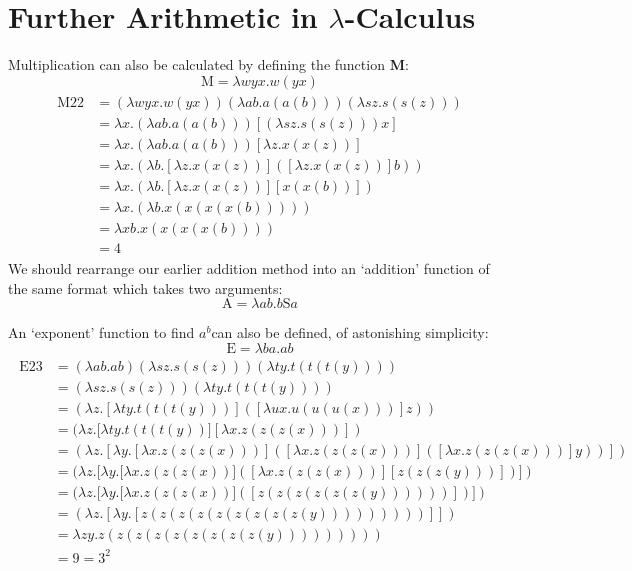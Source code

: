 \documentclass[Master.tex]{subfiles}
\begin{document}
\appendix
\appendixpage
\section{Further Arithmetic in $\lambda$-Calculus}
Multiplication can also be calculated by defining the function \textbf{M}:
\cite{rojas2015lambdatutorial}
\begin{equation*}
\bm{\mathrm{M}} = \lambda wyx.w(yx)
\end{equation*}  
\begin{gather*}
\begin{aligned}
\bm{\mathrm{M22}} &= (\lambda wyx.w(yx))(\lambda ab.a(a(b)))(\lambda sz.s(s(z)))\\
&= \lambda x.(\lambda ab.a(a(b)))[(\lambda sz.s(s(z)))x]\\
&= \lambda x.(\lambda ab.a(a(b)))[\lambda z.x(x(z))]\\
&= \lambda x.(\lambda b.[\lambda z.x(x(z))]([\lambda z.x(x(z))]b))\\
&= \lambda x.(\lambda b.[\lambda z.x(x(z))][x(x(b))])\\
&= \lambda x.(\lambda b.x(x(x(x(b)))))\\
&= \lambda xb.x(x(x(x(b))))\\
&= \bm{\mathrm{4}}
\end{aligned}
\end{gather*}
We should rearrange our earlier addition method into an `addition' function of the same format which takes two arguments:
\begin{equation*}
\bm{\mathrm{A}} = \lambda ab.b\bm{\mathrm{S}}a
\end{equation*}

An `exponent' function to find $a^b$can also be defined, of astonishing simplicity:
\cite{penrose1991emperor}
\begin{equation*}
\bm{\mathrm{E}} = \lambda ba.ab
\end{equation*}
\begin{gather*}
\begin{aligned}
\bm{\mathrm{E23}} &= (\lambda ab.ab)(\lambda sz.s(s(z)))(\lambda ty.t(t(t(y))))\\
&= (\lambda sz.s(s(z)))(\lambda ty.t(t(t(y))))\\
&= (\lambda z.[\lambda ty.t(t(t(y)))]([\lambda ux.u(u(u(x)))]z))\\
&= (\lambda z.[\lambda ty.t(t(t(y))][\lambda x.z(z(z(x)))])\\
&= (\lambda z.[\lambda y.[\lambda x.z(z(z(x)))]([\lambda x.z(z(z(x)))]([\lambda x.z(z(z(x)))]y))])\\
&= (\lambda z.[\lambda y.[\lambda x.z(z(z(x))]([\lambda x.z(z(z(x)))][z(z(z(y)))])])\\
&= (\lambda z.[\lambda y.[\lambda x.z(z(z(x))]([z(z(z(z(z(z(y))))))])])\\
&= (\lambda z.[\lambda y.[z(z(z(z(z(z(z(z(z(y)))))))))]])\\
&= \lambda zy.z(z(z(z(z(z(z(z(z(y)))))))))\\
&= \bm{\mathrm{9}} = \bm{\mathrm{3^2}}
\end{aligned}
\end{gather*}
\end{document}
